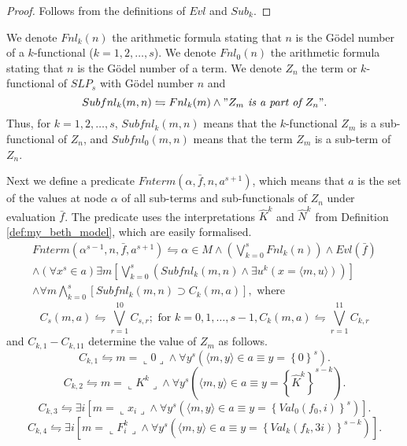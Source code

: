 \documentclass{asl}
\theoremstyle{definition}
\begin{document}
\begin{proof}
Follows from the definitions of $Evl$ and $Sub_k$.
\end{proof}

We denote $Fnl_k(n)$ the arithmetic formula stating that $n$ is the G\"{o}del number of a $k$-functional ($k=1,2,\ldots,s$). We denote $Fnl_0(n)$ the arithmetic formula stating that $n$ is the G\"{o}del number of a term. We denote $Z_n$ the term or $k$-functional of $SLP_s$ with G\"{o}del number $n$ and 
\[Subfnl_k(m,n)\leftrightharpoons Fnl_k(m)\wedge "Z_m\textit{ is a part of }Z_n".\]
Thus, for $k=1,2,\ldots,s$, $Subfnl_k(m,n)$ means that the $k$-functional $Z_m$ is a sub-functional of $Z_n$, and $Subfnl_0(m,n)$ means that the term $Z_m$ is a sub-term of $Z_n$.

Next we define a predicate $Fnterm(\alpha,\bar{f},n,a^{s+1})$, which means that $a$ is the set of the values at node $\alpha$ of all sub-terms and sub-functionals of $Z_n$ under evaluation $\bar{f}$. The predicate uses the interpretations $\hat{K}^k$ and $\hat{N}^k$ from Definition \ref{def:my_beth_model}, which are easily formalised.
\begin{multline*}
Fnterm(\alpha^{s-1},n,\bar{f},a^{s+1})\leftrightharpoons \alpha\in M\wedge \left( \bigvee_{k=0}^s Fnl_k(n)\right) \wedge Evl(\bar{f})
\\
\wedge (\forall x^s\in a)\exists m \left[\bigvee_{k=0}^s \left(Subfnl_k(m,n)\wedge \exists u^k(x=\langle m,u\rangle)\right)\right] 
\\
\wedge\forall m \bigwedge_{k=0}^s\left[Subfnl_k(m,n)\supset C_k(m,a)\right],\text{ where } 
\end{multline*}
\[C_s(m,a)\leftrightharpoons \bigvee_{r=1}^{10}C_{s,r};
\text{ for }  k=0,1,\ldots,s-1, 
C_k(m,a)\leftrightharpoons \bigvee_{r=1}^{11}C_{k,r}
\]
and $C_{k,1} - C_{k,11}$ determine the value of $Z_m$ as follows.
\[C_{k,1}\leftrightharpoons m=\llcorner 0\lrcorner\wedge\forall y^s\left(\langle m,y\rangle\in a \equiv y=\left\lbrace 0 \right\rbrace^s \right).\]
\[C_{k,2}\leftrightharpoons m=\llcorner K^k\lrcorner\wedge\forall y^s\left(\langle m,y\rangle\in a \equiv y=\left\lbrace \hat{K}^k \right\rbrace^{s-k} \right).\] 
\[C_{k,3}\leftrightharpoons \exists i\left[m=\llcorner x_i\lrcorner \wedge\forall y^s\left(\langle m,y\rangle\in a \equiv y=\left\lbrace Val_0(f_0,i) \right\rbrace^s \right) \right].\]
\[C_{k,4}\leftrightharpoons \exists i\left[m=\llcorner F^k_i\lrcorner \wedge\forall y^s\left(\langle m,y\rangle\in a \equiv y=\left\lbrace Val_k(f_k,3i) \right\rbrace^{s-k} \right) \right].\]
\end{document}
